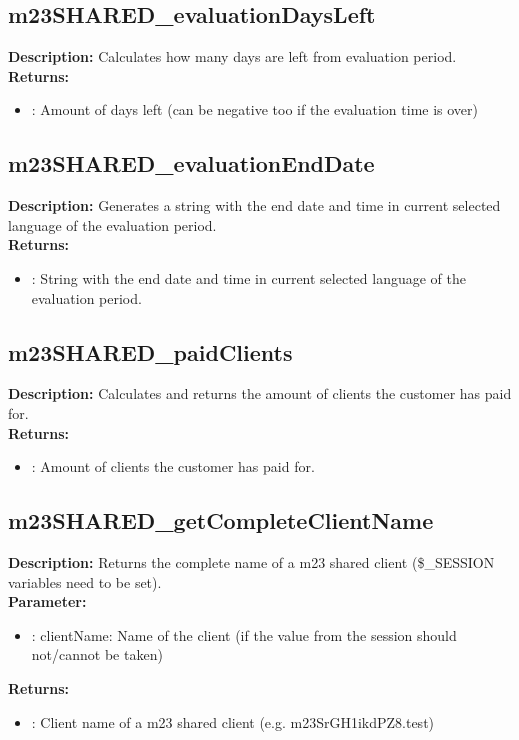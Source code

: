 \subsection{m23SHARED\_evaluationDaysLeft}
\textbf{Description:} Calculates how many days are left from evaluation period.\\
\textbf{Returns:}
\begin{itemize}
\item : Amount of days left (can be negative too if the evaluation time is over)
\end{itemize}

\subsection{m23SHARED\_evaluationEndDate}
\textbf{Description:} Generates a string with the end date and time in current selected language of the evaluation period.\\
\textbf{Returns:}
\begin{itemize}
\item : String with the end date and time in current selected language of the evaluation period.
\end{itemize}

\subsection{m23SHARED\_paidClients}
\textbf{Description:} Calculates and returns the amount of clients the customer has paid for.\\
\textbf{Returns:}
\begin{itemize}
\item : Amount of clients the customer has paid for.
\end{itemize}

\subsection{m23SHARED\_getCompleteClientName}
\textbf{Description:} Returns the complete name of a m23 shared client (\$\_SESSION variables need to be set).\\
\textbf{Parameter:}
\begin{itemize}
\item : clientName: Name of the client (if the value from the session should not/cannot be taken)
\end{itemize}
\textbf{Returns:}
\begin{itemize}
\item : Client name of a m23 shared client (e.g. m23SrGH1ikdPZ8.test)
\end{itemize}

